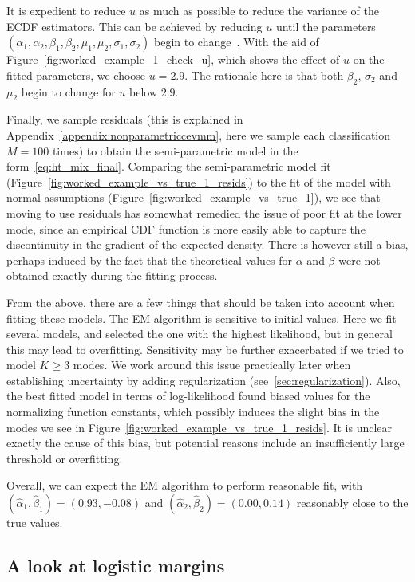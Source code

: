\documentclass[11pt,twoside,openany]{book}
\numberwithin{Theorem}{chapter}
\numberwithin{Definition}{chapter}
\numberwithin{Lemma}{chapter}
\numberwithin{Algorithm}{chapter}
\numberwithin{equation}{chapter}
\begin{document}
It is expedient to reduce $u$ as much as
possible to reduce the variance of the ECDF estimators. This can be achieved by
reducing $u$ until the parameters
$(\alpha_1,\alpha_2,\beta_1,\beta_2,\mu_1,\mu_2,\sigma_1,\sigma_2)$ begin to
change~\citep{tendijck2021modeling}.
With the aid of Figure~\ref{fig:worked_example_1_check_u}, which
shows the effect of $u$ on the fitted parameters, we choose $u=2.9$.
The rationale here is that both $\beta_2$, $\sigma_2$ and $\mu_2$ begin to change
for $u$ below $2.9$.

Finally, we sample residuals (this is explained in Appendix~\ref{appendix:nonparametriccevmm},
here we sample each classification $M=100$ times)
to obtain the semi-parametric model in the form~\eqref{eq:ht_mix_final}.
Comparing the semi-parametric model fit
(Figure~\ref{fig:worked_example_vs_true_1_resids}) to the fit of the model with
normal assumptions (Figure~\ref{fig:worked_example_vs_true_1}), we see that
moving to use residuals has somewhat remedied the issue of poor fit at the
lower mode, since an empirical CDF function is more easily able to capture the
discontinuity in the gradient of the expected density. There is however still a
bias, perhaps induced by the fact that the theoretical values for $\alpha$ and
$\beta$ were not obtained exactly during the fitting process.



From the above, there are a few things that should be taken into account when
fitting these models. The EM algorithm is sensitive to initial values. Here we
fit several models, and selected the one with the highest likelihood, but in
general this may lead to overfitting. Sensitivity may be further exacerbated if
we tried to model $K \geq 3$ modes. We work around this issue
practically later when establishing uncertainty by adding regularization
(see~\ref{sec:regularization}).
Also, the best fitted model in terms of log-likelihood found biased values for
the normalizing function constants, which possibly induces the slight bias in
the modes we see in Figure~\ref{fig:worked_example_vs_true_1_resids}. It is
unclear exactly the cause of this bias, but potential reasons include an
insufficiently large threshold or overfitting.

Overall, we can expect the EM algorithm to perform reasonable fit,
with $(\hat\alpha_1,\hat\beta_1)=(0.93,-0.08)$ and
$(\hat\alpha_2,\hat\beta_2)=(0.00,0.14)$ reasonably close to the
true values.

\FloatBarrier
\subsection{A look at  logistic margins}
\end{document}
